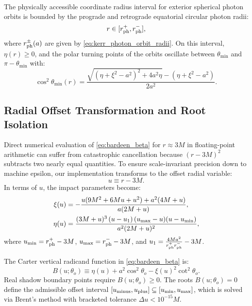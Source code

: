 The physically accessible coordinate radius interval for exterior spherical photon orbits is bounded by the prograde and retrograde equatorial circular photon radii:
\begin{equation}
    r \in [r_{\rm ph}^+, r_{\rm ph}^-],
    \label{eq:spherical_radius_domain}
\end{equation}
where $r_{\rm ph}^\pm(a)$ are given by \eqref{eq:kerr_photon_orbit_radii}. On this interval, $\eta(r) \ge 0$, and the polar turning points of the orbits oscillate between $\theta_{\min}$ and $\pi - \theta_{\min}$ with:
\begin{equation}
    \cos^2\theta_{\min}(r) = \frac{\sqrt{(\eta + \xi^2 - a^2)^2 + 4a^2\eta} - (\eta + \xi^2 - a^2)}{2a^2}.
    \label{eq:spherical_theta_min}
\end{equation}

\subsection{Radial Offset Transformation and Root Isolation}
Direct numerical evaluation of \eqref{eq:bardeen_beta} for $r \approx 3M$ in floating-point arithmetic can suffer from catastrophic cancellation because $(r - 3M)^2$ subtracts two nearly equal quantities. To ensure scale-invariant precision down to machine epsilon, our implementation transforms to the offset radial variable:
\begin{equation}
    u \equiv r - 3M.
    \label{eq:offset_variable_u}
\end{equation}
In terms of $u$, the impact parameters become:
\begin{align}
    \xi(u) &= -\frac{u(9M^2 + 6Mu + u^2) + a^2(4M + u)}{a(2M + u)}, \label{eq:offset_xi} \\
    \eta(u) &= \frac{(3M + u)^3 \left(u - u_1\right)(u_{\rm max} - u)(u - u_{\rm min})}{a^2(2M + u)^2}, \label{eq:offset_eta}
\end{align}
where $u_{\rm min} = r_{\rm ph}^+ - 3M$, $u_{\rm max} = r_{\rm ph}^- - 3M$, and $u_1 = \frac{4Ma^2}{r_{\rm ph}^+ r_{\rm ph}^-} - 3M$.

The Carter vertical radicand function in \eqref{eq:bardeen_beta} is:
\begin{equation}
    B(u; \theta_o) \equiv \eta(u) + a^2\cos^2\theta_o - \xi(u)^2\cot^2\theta_o.
    \label{eq:carter_B_u}
\end{equation}
Real shadow boundary points require $B(u; \theta_o) \ge 0$. The roots $B(u; \theta_o) = 0$ define the admissible offset interval $[u_{\rm minus}, u_{\rm plus}] \subseteq [u_{\rm min}, u_{\rm max}]$, which is solved via Brent's method with bracketed tolerance $\Delta u < 10^{-15}M$.

